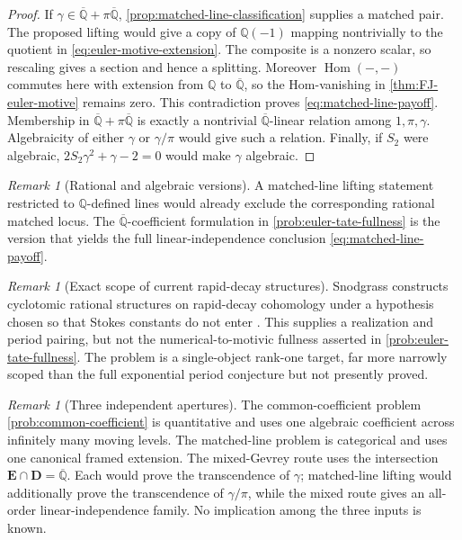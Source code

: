 \documentclass[11pt]{article}
\theoremstyle{definition}
\theoremstyle{remark}
\newtheorem{remark}[theorem]{Remark}
\newcommand{\Q}{\mathbb Q}
\newcommand{\Qbar}{\overline{\mathbb Q}}
\begin{document}
\begin{proof}
If \(\gamma\in\Qbar+\pi\Qbar\),
\cref{prop:matched-line-classification} supplies a matched pair.  The
proposed lifting would give a copy of \(\Q(-1)\) mapping nontrivially to the quotient
in \eqref{eq:euler-motive-extension}.  The composite is a nonzero scalar,
so rescaling gives a section and hence a splitting.  Moreover
\(\operatorname{Hom}(-,-)\) commutes here with extension from \(\Q\) to
\(\Qbar\), so the Hom-vanishing in \cref{thm:FJ-euler-motive} remains
zero.  This contradiction proves \eqref{eq:matched-line-payoff}.  Membership
in \(\Qbar+\pi\Qbar\) is exactly a nontrivial \(\Qbar\)-linear relation
among \(1,\pi,\gamma\).  Algebraicity of either \(\gamma\) or
\(\gamma/\pi\) would give such a relation.  Finally, if \(S_2\) were
algebraic, \(2S_2\gamma^2+\gamma-2=0\) would make \(\gamma\) algebraic.
\end{proof}

\begin{remark}[Rational and algebraic versions]
A matched-line lifting statement restricted to \(\Q\)-defined lines would
already exclude the corresponding rational matched locus.  The
\(\Qbar\)-coefficient formulation in \cref{prob:euler-tate-fullness} is the
version that yields the full linear-independence conclusion
\eqref{eq:matched-line-payoff}.
\end{remark}

\begin{remark}[Exact scope of current rapid-decay structures]
Snodgrass constructs cyclotomic rational structures on rapid-decay
cohomology under a hypothesis chosen so that Stokes constants do not enter
\cite[\S1.2]{Snodgrass2026}.  This supplies a realization and period pairing,
but not the numerical-to-motivic fullness asserted in
\cref{prob:euler-tate-fullness}.  The problem is a single-object rank-one
target, far more narrowly scoped than the full exponential period conjecture
but not presently proved.
\end{remark}

\begin{remark}[Three independent apertures]
The common-coefficient problem \cref{prob:common-coefficient} is quantitative
and uses one algebraic coefficient across infinitely many moving levels.
The matched-line problem is categorical and uses one canonical framed
extension.  The mixed-Gevrey route uses the intersection
\(\mathbf E\cap\mathbf D=\Qbar\).  Each would prove the transcendence of
\(\gamma\); matched-line lifting would additionally prove the
transcendence of \(\gamma/\pi\), while the mixed route gives an all-order
linear-independence family.  No implication among the three inputs is known.
\end{remark}
\end{document}
